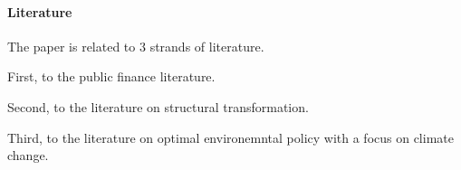 \paragraph{Literature}

The paper is related to 3 strands of literature. 

First, to the public finance literature. 

Second, to the literature on structural transformation. 

Third, to the literature on optimal environemntal policy with a focus on climate change. 